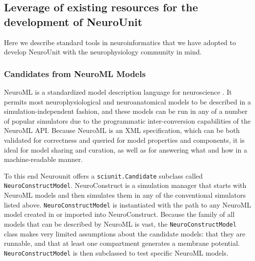 \documentclass[11pt,letterpaper]{article}
\begin{document}
\subsection{Leverage of existing resources for the development of NeuroUnit}
Here we describe standard tools in neuroinformatics that we have adopted to develop NeuroUnit \cite{neurounit_url} with the neurophysiology community in mind.  

\subsubsection{Candidates from NeuroML Models}
NeuroML is a standardized model description language for neuroscience \cite{gleeson_neuroml:_2010}. It permits most neurophysiological and neuroanatomical models to be described in a simulation-independent fashion, and these models can be run in any of a number of popular simulators due to the programmatic inter-conversion capabilities of the NeuroML API.  Because NeuroML is an XML specification, which can be both validated for correctness and queried for model properties and components, it is ideal for model sharing and curation, as well as for answering what and how in a machine-readable manner.  

To this end Neurounit offers a \verb|sciunit.Candidate| subclass called \verb|NeuroConstructModel|. NeuroConstruct \cite{neuroconstruct_url,gleeson_neuroconstruct:_2007} is a simulation manager that starts with NeuroML models and then simulates them in any of the conventional simulators listed above. \verb|NeuroConstructModel| is instantiated with the path to any NeuroML model created in or imported into NeuroConstruct.  Because the family of all models that can be described by NeuroML is vast, the \verb|NeuroConstructModel| class makes very limited assumptions about the candidate models: that they are runnable, and that at least one compartment generates a membrane potential. \verb|NeuroConstructModel| is then subclassed to test specific NeuroML models. 
\end{document}
